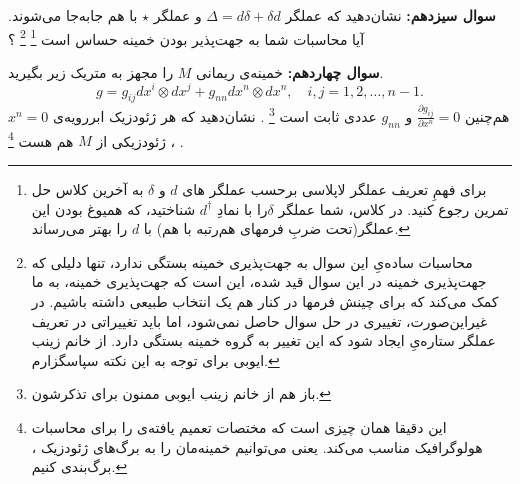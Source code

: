 \documentclass{article}
\begin{document}
	
	\vspace{-1em}
	\endline
	
		\vspace{-1em}
	\textbf{سوال سیزدهم:}
	نشان‌دهید که عملگر 
	$\Delta = d\delta + \delta d$
	 و عملگر $\star$
	 با هم جابه‌جا می‌شوند. آیا محاسبات شما به جهت‌پذیر بودن خمینه حساس است
	 \footnote{برای فهمِ تعریف عملگر لاپلاسی برحسب عملگر های $d$ و $\delta$ به آخرین کلاس حل ‌تمرین رجوع کنید. در کلاس، شما عملگر $\delta$‌را با نمادِ
	 $d^\dagger$
	 شناختید، که همیوغ بودن این عملگر(تحت ضربِ فرمهای هم‌رتبه با هم) با $d$ را بهتر می‌رساند.}
	 \footnote{محاسبات ساده‌یِ این سوال به جهت‌پذیری خمینه بستگی ندارد، تنها دلیلی که جهت‌پذیری خمینه در این سوال قید شده، این است که جهت‌پذیری خمینه، به ما کمک می‌کند که برای چینش فرمها در کنار هم یک انتخاب طبیعی داشته باشیم. در غیراین‌صورت، تغییری در حل سوال حاصل نمی‌شود، اما باید تغییراتی در تعریف عملگر ستاره‌یِ
	 ایجاد شود که این تغییر به گروه   خمینه بستگی دارد. از خانم زینب ایوبی برای توجه به این نکته سپاسگزارم.}
	 ؟
	
	
	\vspace{-1em}
	\endline
	
	\newpage
		\vspace{-1em}
	\textbf{سوال چهاردهم:}
	خمینه‌ی ریمانی $M$ را مجهز به متریک زیر بگیرید.
	\[
	g= g_{ij} dx^i \otimes dx^j + g_{nn} dx^n \otimes dx^n, \quad i,j = 1,2 , \dots , n-1.
	\]
	هم‌چنین
	$\frac{\partial g_{ij}}{\partial x^n} = 0$
	و 
	$g_{nn}$
	عددی ثابت است
	\footnote{باز هم از خانم زینب ایوبی ممنون برای تذکرشون.}
	.
	نشان‌دهید که هر ژئودزیک ابررویه‌ی 
	$x^n=0$، ژئودزیکی از 
	$M$ هم هست
	\footnote{این دقیقا همان چیزی است که مختصات تعمیم یافته‌ی 
	را برای محاسبات هولوگرافیک مناسب می‌کند. یعنی می‌توانیم خمینه‌مان را به برگ‌های ژئودزیک
	، برگ‌بندی کنیم.
	}
	.
	
	
	\vspace{-1em}
	\endline

	
\end{document}
